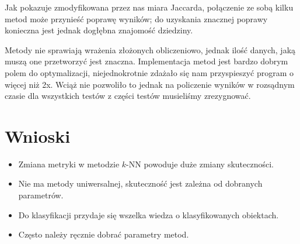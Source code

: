 \documentclass{classrep}
\begin{document}
Jak pokazuje zmodyfikowana przez nas miara Jaccarda, połączenie ze sobą kilku metod może przynieść poprawę wyników; do uzyskania znacznej poprawy konieczna jest jednak dogłębna znajomość dziedziny.

Metody nie sprawiają wrażenia złożonych obliczeniowo, jednak ilość danych, jaką muszą one przetworzyć jest znaczna. Implementacja metod jest bardzo dobrym polem do optymalizacji, niejednokrotnie zdażało się nam przyspieszyć program o więcej niż 2x. Wciąż nie pozwoliło to jednak na policzenie wyników w rozsądnym czasie dla wszystkich testów \ppauza z części testów musieliśmy zrezygnować.

\section{Wnioski}
\begin{itemize}
 \item Zmiana metryki w metodzie $k$-NN powoduje duże zmiany skuteczności.
 \item Nie ma metody uniwersalnej, skuteczność jest zależna od dobranych parametrów.
 \item Do klasyfikacji przydaje się wszelka wiedza o klasyfikowanych obiektach.
 \item Często należy ręcznie dobrać parametry metod.
\end{itemize}

\begin{thebibliography}{0}
\end{thebibliography}
\end{document}
